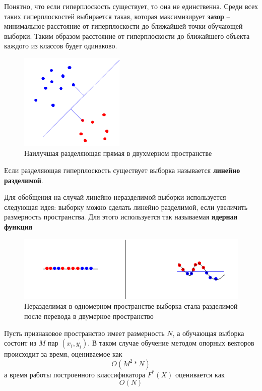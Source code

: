 Понятно, что если гиперплоскость существует, то она не единственна. Среди всех таких гиперплоскостей выбирается такая, которая максимизирует \textbf{зазор} -- минимальное расстояние от гиперплоскости до ближайшей точки обучающей выборки. Таким образом расстояние от гиперплоскости до ближайшего объекта каждого из классов будет одинаково.

\begin{figure}[h]
\begin{center}
\includegraphics[width=5cm]{img/svm}
\end{center}
\caption{Наилучшая разделяющая прямая в двухмерном пространстве}
\label{svm}
\end{figure}

Если разделяющая гиперплоскость существует выборка называется \textbf{линейно разделимой}.

Для обобщения на случай линейно неразделимой выборки используется следующая идея: выборку можно сделать линейно разделимой, если увеличить размерность пространства. Для этого используется так называемая \textbf{ядерная функция}

\begin{figure}[h]
\begin{center}
\includegraphics[width=15cm]{img/svm2}
\end{center}
\caption{Неразделимая в одномерном пространстве выборка стала разделимой после перевода в двумерное пространство}
\label{svm-kernel}
\end{figure}

Пусть признаковое пространство имеет размерность $N$, а обучающая выборка состоит из $M$ пар $(x_i, y_i)$. В таком случае обучение методом опорных векторов происходит за время, оцениваемое как
\begin{equation}
O(M^2*N)
\end{equation}
а время работы построенного классификатора $F^*(X)$ оценивается как 
\begin{equation}
O(N)
\end{equation}

